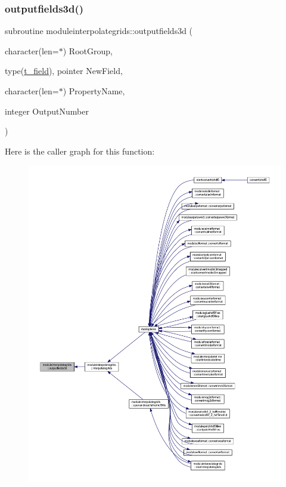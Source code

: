 \subsubsection{\texorpdfstring{outputfields3d()}{outputfields3d()}}
{\footnotesize\ttfamily subroutine moduleinterpolategrids\+::outputfields3d (\begin{DoxyParamCaption}\item[{character(len=$\ast$)}]{Root\+Group,  }\item[{type(\mbox{\hyperlink{structmoduleinterpolategrids_1_1t__field}{t\+\_\+field}}), pointer}]{New\+Field,  }\item[{character(len=$\ast$)}]{Property\+Name,  }\item[{integer}]{Output\+Number }\end{DoxyParamCaption})\hspace{0.3cm}{\ttfamily [private]}}

Here is the caller graph for this function\+:\nopagebreak
\begin{figure}[H]
\begin{center}
\leavevmode
\includegraphics[width=350pt]{namespacemoduleinterpolategrids_aa57bfeb2d55f2dec2c8b2e7b627fd6bf_icgraph}
\end{center}
\end{figure}
\mbox{\label{namespacemoduleinterpolategrids_a95af09d76985241fb13663924158fb28}} 
